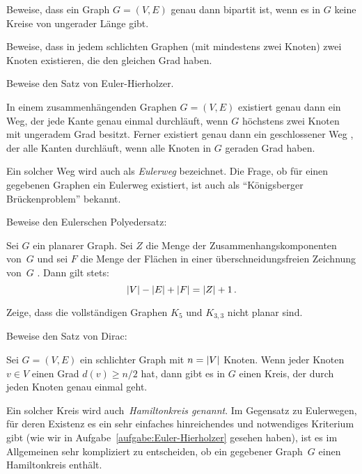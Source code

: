 \begin{aufgabe*}\label{aufgabe:Bipartit}
	Beweise, dass ein Graph $G=(V,E)$ genau dann bipartit ist, wenn es in $G$ keine Kreise von ungerader Länge gibt.
\end{aufgabe*}
\begin{aufgabe*}\label{aufgabe:Schlicht}
	Beweise, dass in jedem schlichten Graphen (mit mindestens zwei Knoten) zwei Knoten existieren, die den gleichen Grad haben.
\end{aufgabe*}
\begin{aufgabe*}[*]\label{aufgabe:Euler-Hierholzer}
	Beweise den Satz von Euler-Hierholzer.
	\begin{satzmitnamen}
		In einem zusammenhängenden Graphen $G=(V,E)$ existiert genau dann ein Weg, der jede Kante genau einmal durchläuft, wenn $G$ höchstens zwei Knoten mit ungeradem Grad besitzt. Ferner existiert genau dann ein geschlossener Weg , der alle Kanten durchläuft, wenn alle Knoten in $G$ geraden Grad haben.
	\end{satzmitnamen}
\end{aufgabe*}

Ein solcher Weg wird auch als \emph{Eulerweg} bezeichnet. Die Frage, ob für einen gegebenen Graphen ein Eulerweg existiert, ist auch als \enquote{Königsberger Brückenproblem} bekannt. 

\begin{aufgabe*}[*]\label{aufgabe:Polyeder}
	Beweise den Eulerschen Polyedersatz:
	\begin{satzmitnamen}
		Sei $G$ ein planarer Graph. Sei $Z$ die Menge der Zusammenhangskomponenten von~$G$ und sei $F$ die Menge der Flächen in einer überschneidungsfreien Zeichnung von~$G$ . Dann gilt stets:
		\begin{equation*}
			\abs{V}-\abs{E}+\abs*{F} = \abs*{Z}+1\,.
		\end{equation*}
	\end{satzmitnamen}
\end{aufgabe*}
\begin{aufgabe*}[*]\label{aufgabe:Unplanar}
	Zeige, dass die vollständigen Graphen $K_5$ und $K_{3,3}$ nicht planar sind.
\end{aufgabe*}
\begin{aufgabe*}[**]\label{aufgabe:Dirac}
	Beweise den Satz von Dirac:
	\begin{satzmitnamen}
		Sei $G=(V,E)$ ein schlichter Graph mit $n=\abs*{V}$ Knoten. Wenn jeder Knoten $v\in V$ einen Grad $d(v)\geqslant n/2$ hat, dann gibt es in $G$ einen Kreis, der durch jeden Knoten genau einmal geht.
	\end{satzmitnamen}
\end{aufgabe*}
Ein solcher Kreis wird auch~\emph{Hamiltonkreis genannt}. Im Gegensatz zu Eulerwegen, für deren Existenz es ein sehr einfaches hinreichendes und notwendiges Kriterium gibt (wie wir in Aufgabe~\ref{aufgabe:Euler-Hierholzer} gesehen haben), ist es im Allgemeinen sehr kompliziert zu entscheiden, ob ein gegebener Graph~$G$ einen Hamiltonkreis enthält.

